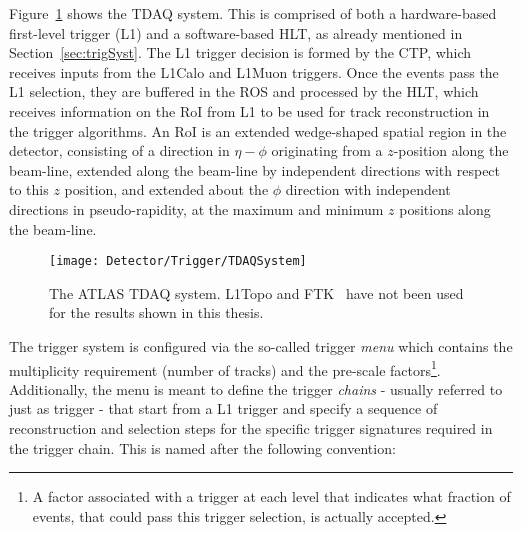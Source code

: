 		Figure~\ref{fig:TDAQSyst} shows the \ac{TDAQ} system. This is comprised of both a hardware-based first-level trigger (\ac{L1}) and a software-based \ac{HLT}, as already mentioned in Section~\ref{sec:trigSyst}. The \ac{L1} trigger decision is formed by the \ac{CTP}, which receives inputs from the \ac{L1Calo} and \ac{L1Muon} triggers. Once the events pass the \ac{L1} selection, they are buffered in the \ac{ROS} and processed by the \ac{HLT}, which receives information on the \ac{RoI} from \ac{L1} to be used for track reconstruction in the trigger algorithms.
		An \ac{RoI} is an extended wedge-shaped spatial region in the detector, consisting of a direction in $\eta-\phi$ originating from a $z$-position along the beam-line, extended along the beam-line by independent directions with respect to this $z$ position, and extended about the $\phi$ direction with independent directions in pseudo-rapidity, at the maximum and minimum $z$ positions along the beam-line. %

		\begin{figure}[!htb]
			\centering
			\texttt{[image: Detector/Trigger/TDAQSystem]}
			\caption{The \ac{ATLAS} \ac{TDAQ} system. \acs{L1Topo} and \ac{FTK}~\cite{ATLASTrigger2015} have not been used for the results shown in this thesis.}
			\label{fig:TDAQSyst}
		\end{figure}

		The trigger system is configured via the so-called trigger \textit{menu} which contains the multiplicity requirement (number of tracks) and the pre-scale factors\footnote{A factor associated with a trigger at each level that indicates what fraction of events, that could pass this trigger selection, is actually accepted.}. Additionally, the menu is meant to define the trigger \textit{chains} - usually referred to just as trigger - that start from a \ac{L1} trigger and specify a sequence of reconstruction and selection steps for the specific trigger signatures required in the trigger chain. This is named after the following convention: 

